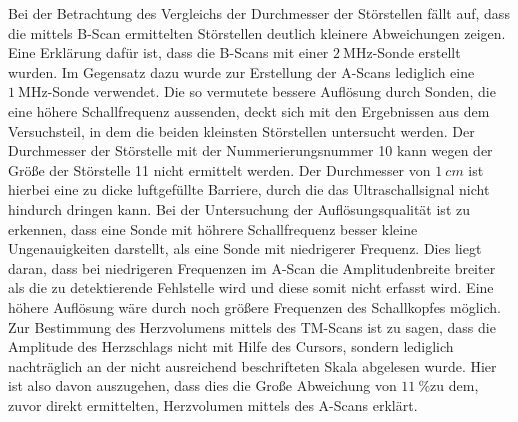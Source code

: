 \FloatBarrier
Bei der Betrachtung des Vergleichs der Durchmesser der Störstellen fällt auf, dass die mittels B-Scan ermittelten Störstellen deutlich kleinere
Abweichungen zeigen. Eine Erklärung dafür ist, dass die B-Scans mit einer $\SI{2}{\mega \hertz}$-Sonde erstellt wurden. Im Gegensatz dazu wurde
zur Erstellung der A-Scans lediglich eine $\SI{1}{\mega \hertz}$-Sonde verwendet. Die so vermutete bessere Auflösung durch Sonden, die eine höhere
Schallfrequenz aussenden, deckt sich mit den Ergebnissen aus dem Versuchsteil, in dem die beiden kleinsten Störstellen untersucht werden.
Der Durchmesser der Störstelle mit der Nummerierungsnummer 10 kann wegen der Größe der Störstelle 11 nicht ermittelt werden. Der Durchmesser
von $\SI{1}{cm}$ ist hierbei eine zu dicke luftgefüllte Barriere, durch die das Ultraschallsignal nicht hindurch dringen kann.
Bei der Untersuchung der Auflösungsqualität ist zu erkennen, dass eine Sonde mit höhrere Schallfrequenz besser kleine Ungenauigkeiten darstellt, als
eine Sonde mit niedrigerer Frequenz. Dies liegt daran, dass bei niedrigeren Frequenzen im A-Scan die Amplitudenbreite breiter als die zu detektierende
Fehlstelle wird und diese somit nicht erfasst wird. Eine höhere Auflösung wäre durch noch größere Frequenzen des Schallkopfes möglich.
Zur Bestimmung des Herzvolumens mittels des TM-Scans ist zu sagen, dass die Amplitude des Herzschlags nicht mit Hilfe des Cursors, sondern lediglich
nachträglich an der nicht ausreichend beschrifteten Skala abgelesen wurde. Hier ist also davon auszugehen, dass dies die Große Abweichung von
$\SI{11}{\percent}$zu dem, zuvor direkt ermittelten, Herzvolumen mittels des A-Scans erklärt.

\nocite{*}
\printbibliography

